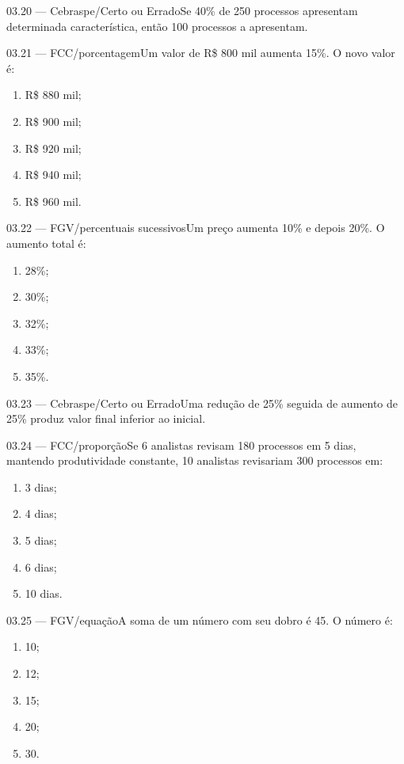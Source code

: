 \begin{questao}{ 03.20 — Cebraspe/Certo ou Errado}Se 40\% de 250 processos apresentam determinada característica, então 100 processos a apresentam.\end{questao}
\begin{questao}{ 03.21 — FCC/porcentagem}Um valor de R\$ 800 mil aumenta 15\%. O novo valor é:\begin{enumerate}[label=\Alph*)]\item R\$ 880 mil;\item R\$ 900 mil;\item R\$ 920 mil;\item R\$ 940 mil;\item R\$ 960 mil.\end{enumerate}\end{questao}
\begin{questao}{ 03.22 — FGV/percentuais sucessivos}Um preço aumenta 10\% e depois 20\%. O aumento total é:\begin{enumerate}[label=\Alph*)]\item 28\%;\item 30\%;\item 32\%;\item 33\%;\item 35\%.\end{enumerate}\end{questao}
\begin{questao}{ 03.23 — Cebraspe/Certo ou Errado}Uma redução de 25\% seguida de aumento de 25\% produz valor final inferior ao inicial.\end{questao}
\begin{questao}{ 03.24 — FCC/proporção}Se 6 analistas revisam 180 processos em 5 dias, mantendo produtividade constante, 10 analistas revisariam 300 processos em:\begin{enumerate}[label=\Alph*)]\item 3 dias;\item 4 dias;\item 5 dias;\item 6 dias;\item 10 dias.\end{enumerate}\end{questao}
\begin{questao}{ 03.25 — FGV/equação}A soma de um número com seu dobro é 45. O número é:\begin{enumerate}[label=\Alph*)]\item 10;\item 12;\item 15;\item 20;\item 30.\end{enumerate}\end{questao}


